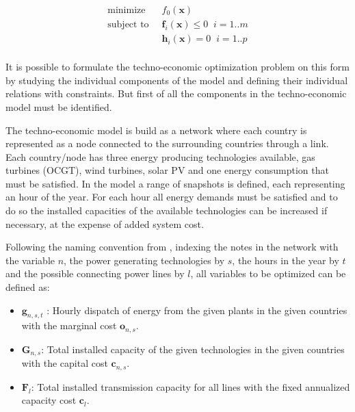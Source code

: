 \begin{equation}\label{eq:ConvexOptimization}
\begin{split}
\text{minimize} \;&\; f_0(\mathbf{x})   \; \\
\text{subject to} \; &\; \mathbf{f}_i(\mathbf{x}) \leq 0 \; \; i=1..m\\
\;			&\;  \mathbf{h}_i(\mathbf{x}) = 0 \; \; i=1..p\\
\end{split}
\end{equation}

It is possible to formulate the techno-economic optimization problem on this form by studying the individual components of the model and defining their individual relations with constraints. But first of all the components in the techno-economic model must be identified. 

The techno-economic model is build as a network where each country is represented as a node connected to the surrounding countries through a link. Each country/node has three energy producing technologies available, gas turbines (OCGT), wind turbines, solar PV and one energy consumption that must be satisfied. In the model a range of snapshots is defined, each representing an hour of the year. For each hour all energy demands must be satisfied and to do so the installed capacities of the available technologies can be increased if necessary, at the expense of added system cost. 

Following the naming convention from \cite{PyPSA_euro_30_model}, indexing the notes in the network with the variable $n$, the power generating technologies by $s$, the hours in the year by $t$ and the possible connecting power lines by $l$, all variables to be optimized can be defined as: 

\begin{itemize}
	\item $\mathbf{g}_{n,s,t}$ : Hourly dispatch of energy from the given plants in the given countries with the marginal cost $\mathbf{o}_{n,s}$.
	\item $\mathbf{G}_{n,s}$: Total installed capacity of the given technologies in the given countries  with the capital cost $\mathbf{c}_{n,s}$.
	\item $\mathbf{F}_{l}$: Total installed transmission capacity for all lines with the fixed annualized capacity cost $\mathbf{c}_{l}$.
\end{itemize}


